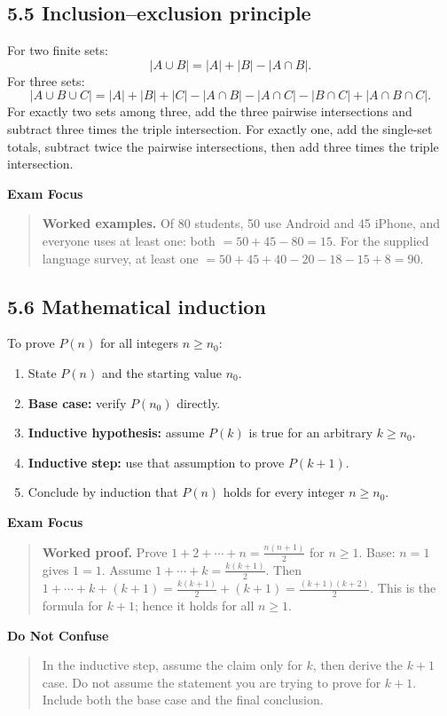 \documentclass[11pt,a4paper]{article}
\newenvironment{exambox}{\par\medskip\noindent\color{blue}\textbf{Exam Focus}\par\smallskip\color{black}\begin{quote}}{\end{quote}\medskip}
\newenvironment{dangerbox}{\par\medskip\noindent\color{red}\textbf{Do Not Confuse}\par\smallskip\color{black}\begin{quote}}{\end{quote}\medskip}
\begin{document}
\subsection{5.5 Inclusion--exclusion principle}
For two finite sets:
\[
|A\cup B|=|A|+|B|-|A\cap B|.
\]
For three sets:
\[
|A\cup B\cup C|=|A|+|B|+|C|-|A\cap B|-|A\cap C|-|B\cap C|+|A\cap B\cap C|.
\]
For exactly two sets among three, add the three pairwise intersections and subtract three times the triple intersection. For exactly one, add the single-set totals, subtract twice the pairwise intersections, then add three times the triple intersection.

\begin{exambox}\textbf{Worked examples.} Of 80 students, 50 use Android and 45 iPhone, and everyone uses at least one: both $=50+45-80=15$. For the supplied language survey, at least one $=50+45+40-20-18-15+8=90$.\end{exambox}

\subsection{5.6 Mathematical induction}
To prove $P(n)$ for all integers $n\ge n_0$:
\begin{enumerate}
\item State $P(n)$ and the starting value $n_0$.
\item \textbf{Base case:} verify $P(n_0)$ directly.
\item \textbf{Inductive hypothesis:} assume $P(k)$ is true for an arbitrary $k\ge n_0$.
\item \textbf{Inductive step:} use that assumption to prove $P(k+1)$.
\item Conclude by induction that $P(n)$ holds for every integer $n\ge n_0$.
\end{enumerate}

\begin{exambox}\textbf{Worked proof.} Prove $1+2+\cdots+n=\frac{n(n+1)}2$ for $n\ge1$. Base: $n=1$ gives $1=1$. Assume $1+\cdots+k=\frac{k(k+1)}2$. Then $1+\cdots+k+(k+1)=\frac{k(k+1)}2+(k+1)=\frac{(k+1)(k+2)}2$. This is the formula for $k+1$; hence it holds for all $n\ge1$.\end{exambox}

\begin{dangerbox}In the inductive step, assume the claim only for $k$, then derive the $k+1$ case. Do not assume the statement you are trying to prove for $k+1$. Include both the base case and the final conclusion.\end{dangerbox}
\end{document}

